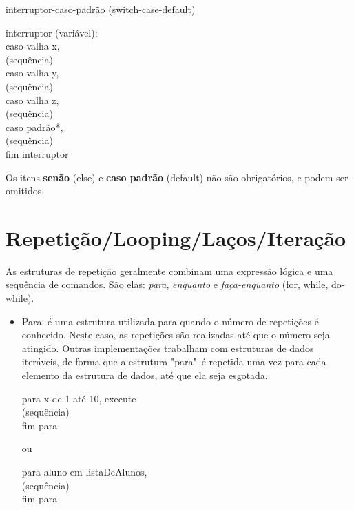 \documentclass{beamer}%
\def\azul{\color{blue!90!black}}
\begin{document}
\begin{frame}
interruptor-caso-padrão (switch-case-default)

{\azul interruptor (variável):\\
\qquad    caso valha x,\\
\qquad\qquad    (sequência)\\
\qquad    caso valha y,\\
\qquad\qquad    (sequência)\\
\qquad    caso valha z,\\
\qquad\qquad    (sequência)\\
\qquad    caso padrão*,\\
\qquad\qquad    (sequência)\\
fim interruptor
}

Os itens \textbf{senão} (else) e \textbf{caso padrão} (default) não são
obrigatórios, e podem ser omitidos.
\end{frame}






\section[Repetição]{Repetição/Looping/Laços/Iteração}
\begin{frame}
As estruturas de repetição geralmente combinam uma expressão lógica
e uma sequência de comandos. São elas: \textit{para},
\textit{enquanto} e \textit{faça-enquanto} (for, while, do-while).
\begin{itemize}\justifying
\item Para: é uma estrutura utilizada para quando o número de
repetições é conhecido. Neste caso, as repetições são realizadas
até que o número seja atingido. Outras implementações trabalham com
estruturas de dados iteráveis, de forma que a estrutura "para"\ é
repetida uma vez para cada elemento da estrutura de dados, até que ela
seja esgotada.


{\azul para x de 1 até 10, execute\\
\qquad  (sequência)\\
fim para
}


ou


{\azul para aluno em listaDeAlunos,\\
\qquad  (sequência)\\
fim para
}

\end{itemize}
\end{frame}
\end{document}
